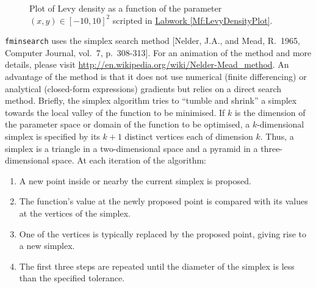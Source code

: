 \begin{figure}[htpb]
\caption{Plot of Levy density as a function of the parameter $(x,y) \in [-10,10]^2$ scripted in \hyperref[Mf:LevyDensityPlot]{Labwork \ref*{Mf:LevyDensityPlot}}.\label {F:LevyDensityPlot}}
\begin{center}
\end{center}
\end{figure}

{\tt fminsearch} uses the simplex search method [Nelder, J.A., and Mead, R.~1965, Computer Journal, vol.~7, p.~308-313].  For an animation of the method and more details, please visit \href{http://en.wikipedia.org/wiki/Nelder-Mead_method}{\url{http://en.wikipedia.org/wiki/Nelder-Mead_method}}.  
An advantage of the method is that it does not use numerical (finite differencing) or analytical (closed-form expressions) gradients but relies on a direct search method.  Briefly, the simplex algorithm tries to ``tumble and shrink'' a simplex towards the local valley of the function to be minimised.  If $k$ is the dimension of the parameter space or domain of the function to be optimised, a $k$-dimensional simplex is specified by its $k+1$ distinct vertices each of dimension $k$.  Thus, a simplex is a triangle in a two-dimensional space and a pyramid in a three-dimensional space. At each iteration of the algorithm: 
\begin{enumerate}
\item A new point inside or nearby the current simplex is proposed.
\item The function's value at the newly proposed point is compared with its values at the vertices of the simplex. 
\item One of the vertices is typically replaced by the proposed point, giving rise to a new simplex. 
\item The first three steps are repeated until the diameter of the simplex is less than the specified tolerance.  
\end{enumerate}

